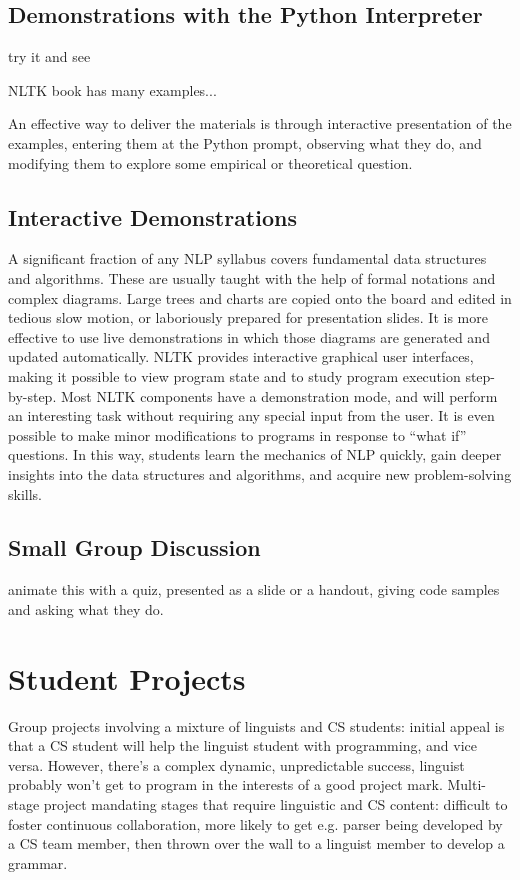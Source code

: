\documentclass[11pt]{article}
\begin{document}
\subsection{Demonstrations with the Python Interpreter}

try it and see

NLTK book has many examples...

An effective way to deliver the materials is through interactive
presentation of the examples, entering them at the Python prompt,
observing what they do, and modifying them to explore some empirical
or theoretical question.


\subsection{Interactive Demonstrations}

A significant fraction of any NLP syllabus covers fundamental data
structures and algorithms. These are usually taught with the help of
formal notations and complex diagrams. Large trees and charts are
copied onto the board and edited in tedious slow motion, or
laboriously prepared for presentation slides. It is more effective to
use live demonstrations in which those diagrams are generated and
updated automatically. NLTK provides interactive graphical user
interfaces, making it possible to view program state and to study
program execution step-by-step. Most NLTK components have a
demonstration mode, and will perform an interesting task without
requiring any special input from the user. It is even possible to make
minor modifications to programs in response to ``what if'' questions. In
this way, students learn the mechanics of NLP quickly, gain deeper
insights into the data structures and algorithms, and acquire new
problem-solving skills.

\subsection{Small Group Discussion}

animate this with a quiz, presented as a slide or a handout, giving code samples and asking what they do.

\section{Student Projects}
\label{sec:student-projects}

Group projects involving a mixture of linguists and CS students:
initial appeal is that a CS student will help the linguist student with programming,
and vice versa.  However, there's a
complex dynamic, unpredictable success, linguist probably won't get to program
in the interests of a good project mark.
Multi-stage project mandating stages that require linguistic and CS content: difficult
to foster continuous collaboration, more likely to get e.g. parser being developed by
a CS team member, then thrown over the wall to a linguist member to develop a grammar.
\end{document}
